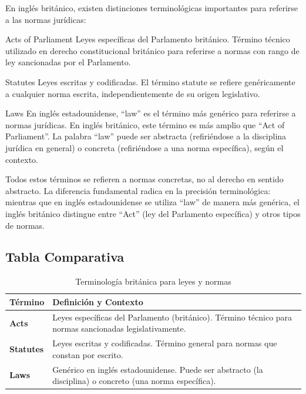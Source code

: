 \documentclass[12pt,oneside]{book}
\begin{document}
En inglés británico, existen distinciones terminológicas importantes para referirse a las normas jurídicas:

\begin{definition}{Acts of Parliament}
Leyes específicas del Parlamento británico. Término técnico utilizado en derecho constitucional británico para referirse a normas con rango de ley sancionadas por el Parlamento.
\end{definition}

\begin{definition}{Statutes}
Leyes escritas y codificadas. El término statute se refiere genéricamente a cualquier norma escrita, independientemente de su origen legislativo.
\end{definition}

\begin{definition}{Laws}
En inglés estadounidense, ``law'' es el término más genérico para referirse a normas jurídicas. En inglés británico, este término es más amplio que ``Act of Parliament''. La palabra ``law'' puede ser abstracta (refiriéndose a la disciplina jurídica en general) o concreta (refiriéndose a una norma específica), según el contexto.
\end{definition}

Todos estos términos se refieren a normas concretas, no al derecho en sentido abstracto. La diferencia fundamental radica en la precisión terminológica: mientras que en inglés estadounidense se utiliza ``law'' de manera más genérica, el inglés británico distingue entre ``Act'' (ley del Parlamento específica) y otros tipos de normas.

\subsection{Tabla Comparativa}

\begin{table}[H]
\centering
\begin{tabularx}{\textwidth}{
    >{\raggedright\arraybackslash}p{}
    >{\raggedright\arraybackslash}X
}
\toprule
\textbf{Término} & \textbf{Definición y Contexto} \\
\midrule
\textbf{Acts} & Leyes específicas del Parlamento (británico). Término técnico para normas sancionadas legislativamente. \\
\textbf{Statutes} & Leyes escritas y codificadas. Término general para normas que constan por escrito. \\
\textbf{Laws} & Genérico en inglés estadounidense. Puede ser abstracto (la disciplina) o concreto (una norma específica). \\
\bottomrule
\end{tabularx}
\caption{Terminología británica para leyes y normas}
\end{table}
\end{document}
